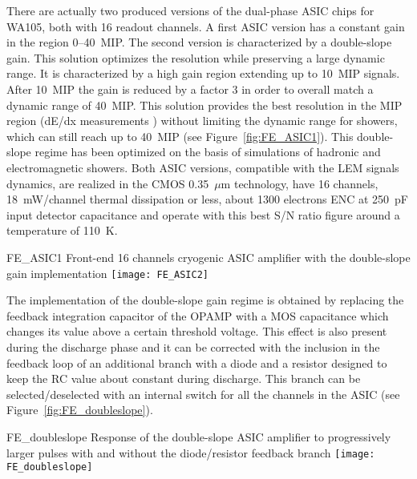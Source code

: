 There are actually two produced versions of the dual-phase ASIC chips
for WA105, both with 16 readout channels. A first ASIC version has a
constant gain in the region 0--40~MIP. The second version is
characterized by a double-slope gain. This solution optimizes the
resolution while preserving a large dynamic range. It is characterized
by a high gain region extending up to 10~MIP signals. After 10~MIP the
gain is reduced by a factor 3 in order to overall match a dynamic
range of 40~MIP. This solution provides the best resolution in the MIP
region (dE/dx measurements ) without limiting the dynamic range for
showers, which can still reach up to 40~MIP (see
Figure~\ref{fig:FE_ASIC1}). This double-slope regime has been
optimized on the basis of simulations of hadronic and electromagnetic
showers. Both ASIC versions, compatible with the LEM signals dynamics,
are realized in the CMOS 0.35~$\mu$m technology, have 16 channels,
18~mW/channel thermal dissipation or less, about 1300 electrons ENC at
250~pF input detector capacitance and operate with this best S/N ratio
figure around a temperature of 110~K.
\begin{cdrfigure}{FE_ASIC1} {Front-end 16 channels cryogenic ASIC amplifier with the double-slope gain implementation}
\texttt{[image: FE\_ASIC2]}
\end{cdrfigure}

The implementation of the double-slope gain regime is obtained by
replacing the feedback integration capacitor of the OPAMP with a MOS
capacitance which changes its value above a certain threshold
voltage. This effect is also present during the discharge phase and it
can be corrected with the inclusion in the feedback loop of an
additional branch with a diode and a resistor designed to keep the RC
value about constant during discharge. This branch can be
selected/deselected with an internal switch for all the channels in
the ASIC (see Figure~\ref{fig:FE_doubleslope}).
\begin{cdrfigure}{FE_doubleslope}
{Response of the double-slope ASIC amplifier to progressively larger 
pulses with and without the diode/resistor feedback branch}
\texttt{[image: FE\_doubleslope]}
\end{cdrfigure}

